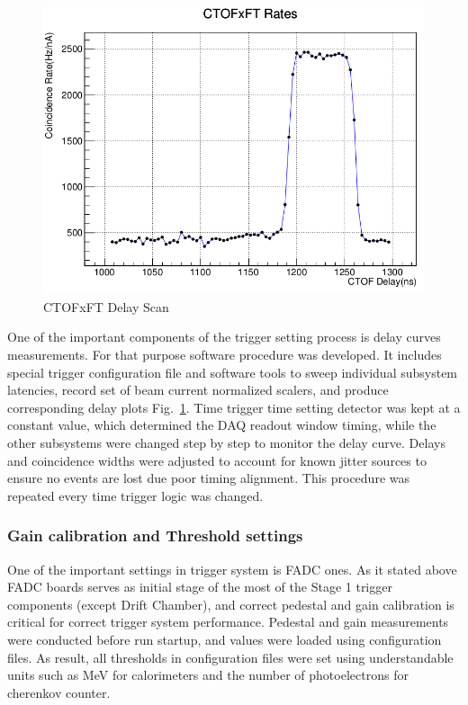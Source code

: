 \begin{figure}[hbt]
	\centering
	\includegraphics[width=1.0\columnwidth,keepaspectratio]{img/delay_scan_ctof_ft.png}
	\caption{CTOFxFT Delay Scan}
	\label{fig:delay_scan_ctof_ft}
\end{figure}

One of the important components of the trigger setting process is delay curves measurements. For that purpose software procedure was developed. It includes special trigger configuration file and software tools to sweep individual subsystem latencies, record set of beam current normalized scalers, and produce corresponding delay plots Fig.~\ref{fig:delay_scan_ctof_ft}. Time trigger time setting detector was kept at a constant value, which determined the DAQ readout window timing, while the other subsystems were changed step by step to monitor the delay curve. Delays and coincidence widths were adjusted to account for known jitter sources to ensure no events are lost due poor timing alignment. This procedure was repeated every time trigger logic was changed.


\subsubsection{Gain calibration and Threshold settings}

One of the important settings in trigger system is FADC ones. As it stated above FADC boards serves as initial stage of the most of the Stage 1 trigger components (except Drift Chamber), and correct pedestal and gain calibration is critical for correct trigger system performance. Pedestal and gain measurements were conducted before run startup, and values were loaded using configuration files. As result, all thresholds in configuration files were set using understandable units such as MeV for calorimeters and the number of photoelectrons for cherenkov counter.
